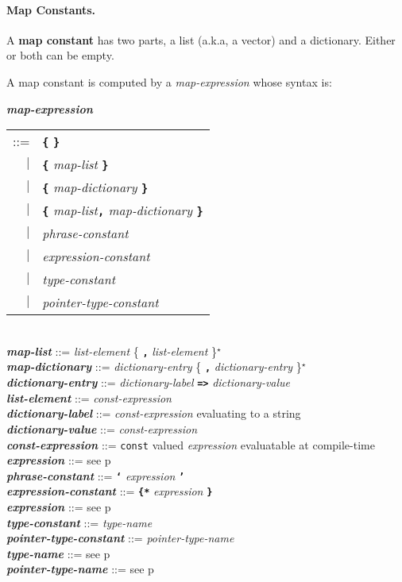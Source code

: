 \documentclass[12pt]{article}
\newcommand{\subsubsubsection}[1]{\paragraph[#1]{#1.}}
\newcommand{\TT}[1]{{\tt \bfseries #1}}
\newcommand{\STAR}{{\Large $^\star$}}
\newcommand{\key}[1]{{\rm \bfseries #1}}
\newcommand{\emkey}[1]{{\em \bfseries #1}}
\newcommand{\pagref}[1]{p\pageref{#1}}
\newenvironment{indpar}[1][0.3in]%
	{\begin{list}{}%
		     {\setlength{\itemsep}{0in}%
		      \setlength{\topsep}{0in}%
		      \setlength{\parsep}{1ex}%
		      \setlength{\labelwidth}{#1}%
		      \setlength{\leftmargin}{#1}%
		      \addtolength{\leftmargin}{\labelsep}}%
	 \item}%
	{\end{list}}
\begin{document}
\subsubsubsection{Map Constants}
\label{MAP-CONSTANTS}

A \key{map constant} has two parts, a list (a.k.a, a vector) and a dictionary.
Either or both can be empty.

A map constant is computed by a {\em map-expression} whose syntax is:

\begin{indpar}
\emkey{map-expression}\label{MAP-EXPRESSION}
    \begin{tabular}[t]{rl}
    ::= & \TT{\{} \TT{\}} \\
    $|$ & \TT{\{} {\em map-list} \TT{\}} \\
    $|$ & \TT{\{} {\em map-dictionary} \TT{\}} \\
    $|$ & \TT{\{} {\em map-list}\TT{,} {\em map-dictionary} \TT{\}} \\
    $|$ & {\em phrase-constant} \\
    $|$ & {\em expression-constant} \\
    $|$ & {\em type-constant} \\
    $|$ & {\em pointer-type-constant} \\
    \end{tabular}
\\[0.5ex]
\emkey{map-list} ::= {\em list-element} \{ \TT{,} {\em list-element} \}\STAR{}
\\[0.5ex]
\emkey{map-dictionary} ::= {\em dictionary-entry}
                              \{ \TT{,} {\em dictionary-entry} \}\STAR{}
\\[0.5ex]
\emkey{dictionary-entry} ::=
    {\em dictionary-label} \TT{=>} {\em dictionary-value}
\\[0.5ex]
\emkey{list-element}\label{LIST-ELEMENT} ::= {\em const-expression}
\\[0.5ex]
\emkey{dictionary-label}\label{DICTIONARY-LABEL}
    ::= {\em const-expression} evaluating to a string
\\[0.5ex]
\emkey{dictionary-value}\label{DICTIONARY-VALUE}
    ::= {\em const-expression}
\\[0.5ex]
\emkey{const-expression}
    ::= {\tt const} valued {\em expression} evaluatable at compile-time
\\[0.5ex]
\emkey{expression} ::= see \pagref{EXPRESSION}
\\[0.5ex]
\emkey{phrase-constant} ::= \TT{`} {\em expression} \TT{'}
\\[0.5ex]
\emkey{expression-constant} ::= \TT{\{*} {\em expression} \TT{*\}}
\\[0.5ex]
\emkey{expression} ::= see \pagref{EXPRESSION}
\\[0.5ex]
\emkey{type-constant} ::= {\em type-name}
\\[0.5ex]
\emkey{pointer-type-constant} ::= {\em pointer-type-name}
\\[0.5ex]
\emkey{type-name} ::= see \pagref{TYPE-NAME}
\\[0.5ex]
\emkey{pointer-type-name} ::= see \pagref{POINTER-TYPE-NAME}
\end{indpar}
\end{document}
